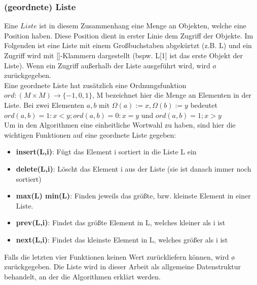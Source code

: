 \subsubsection{(geordnete) Liste}
Eine $Liste$ ist in diesem Zusammenhang eine Menge an Objekten, welche eine Position haben. Diese Position dient in erster Linie dem Zugriff der Objekte. Im Folgenden ist eine Liste mit einem Großbuchstaben abgekürtzt (z.B. L) und ein Zugriff wird mit []-Klammern dargestellt (bspw. L[1] ist das erste Objekt der Liste). Wenn ein Zugriff außerhalb der Liste ausgeführt wird, wird ø zurückgegeben. \\
Eine geordnete Liste hat zusätzlich eine Ordnungsfunktion $ord:(M \times M) \rightarrow \{-1,0,1\}$, M bezeichnet hier die Menge an Elementen in der Liste. Bei zwei Elementen $a,b$ mit $\Omega(a):=x,\Omega(b):=y$ bedeutet $ord(a,b)=1: x<y;ord(a,b)=0: x=y$ und $ord(a,b)=1; x>y$\\
Um in den Algorithmen eine einheitliche Wortwahl zu haben, sind hier die wichtigen Funktionen auf eine geordnete Liste gegeben:
\begin{itemize}
    \item \textbf{insert(L,i)}: Fügt das Element i sortiert in die Liste L ein
    \item \textbf{delete(L,i)}: Löscht das Element i aus der Liste (sie ist danach immer noch sortiert)
    
    \item \textbf{max(L) min(L)}: Finden jeweils das größte, bzw. kleinste Element in einer Liste.
    \item \textbf{prev(L,i)}:  Findet das größte Element in L, welches kleiner als i ist
    \item \textbf{next(L,i)}: Findet das kleinste Element in L, welches größer als i ist
\end{itemize}

Falls die letzten vier Funktionen keinen Wert zurückliefern können, wird ø zurückgegeben. Die Liste wird in dieser Arbeit als allgemeine Datenstruktur behandelt, an der die Algorithmen erklärt werden.

